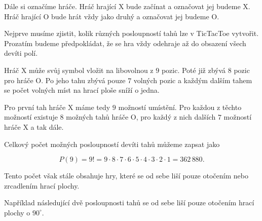 \documentclass[12pt,a4paper]{article}
\begin{document}
Dále si označíme hráče.
Hráč hrající $\mathrm{X}$ bude začínat a označovat jej budeme $\mathrm{X}$.
Hráč hrající $\mathrm{O}$ bude hrát vždy jako druhý a označovat jej budeme $\mathrm{O}$.

Nejprve musíme zjistit, kolik různých posloupností tahů lze v TicTacToe vytvořit.
Prozatím budeme předpokládat, že se hra vždy odehraje až do obsazení všech devíti polí.

Hráč $\mathrm{X}$ může svůj symbol vložit na libovolnou z $9$ pozic.
Poté již zbývá $8$ pozic pro hráče $\mathrm{O}$.
Po jeho tahu zbývá pouze $7$ volných pozic a každým dalším tahem se počet
volných míst na hrací ploše sníží o jedna.

Pro první tah hráče $\mathrm{X}$ máme tedy $9$ možností umístění.
Pro každou z těchto možností existuje $8$ možných tahů hráče $\mathrm{O}$,
pro každý z nich dalších $7$ možností hráče $\mathrm{X}$ a tak dále.

Celkový počet možných posloupností devíti tahů můžeme zapsat jako

\begin{equation}
P(9) = 9! = 9\cdot8\cdot7\cdot6\cdot5\cdot4\cdot3\cdot2\cdot1 = 362\,880.
\label{eq:PocetVsechPoradi}
\end{equation}

Tento počet však stále obsahuje hry, které se od sebe liší pouze otočením
nebo zrcadlením hrací plochy.

Například následující dvě posloupnosti tahů se od sebe liší pouze otočením
hrací plochy o $90^\circ$.
\end{document}
